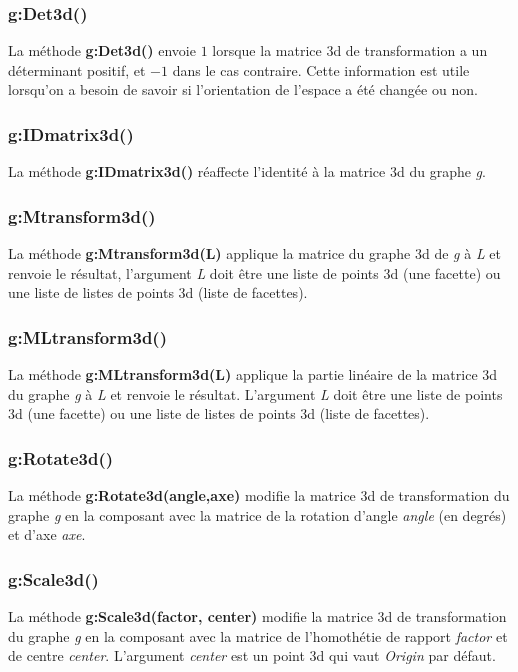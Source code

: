 \subsubsection{g:Det3d()}
La méthode \textbf{g:Det3d()} envoie $1$ lorsque la matrice 3d de transformation a un déterminant positif, et $-1$ dans le cas contraire. Cette information est utile lorsqu'on a besoin de savoir si l'orientation de l'espace a été changée ou non.

\subsubsection{g:IDmatrix3d()}
La méthode \textbf{g:IDmatrix3d()} réaffecte l'identité à la matrice 3d du graphe \emph g.

\subsubsection{g:Mtransform3d()}
La méthode \textbf{g:Mtransform3d(L)} applique la matrice du graphe 3d de \emph g à \emph{L} et renvoie le résultat, l'argument \emph L doit être une liste de points 3d (une facette) ou une liste de listes de points 3d (liste de facettes).

\subsubsection{g:MLtransform3d()}
La méthode \textbf{g:MLtransform3d(L)} applique la partie linéaire de la matrice 3d du graphe \emph g à \emph{L} et renvoie le résultat. L'argument \emph L doit être une liste de points 3d (une facette) ou une liste de listes de points 3d (liste de facettes).

\subsubsection{g:Rotate3d()}
La méthode \textbf{g:Rotate3d(angle,axe)} modifie la matrice 3d de transformation du graphe \emph g en la composant avec la matrice de la rotation d'angle \emph{angle} (en degrés) et d'axe \emph{axe}. 

\subsubsection{g:Scale3d()}
La méthode \textbf{g:Scale3d(factor, center)} modifie la matrice 3d de transformation du graphe \emph g en la composant avec la matrice de l'homothétie de rapport \emph{factor} et de centre \emph{center}. L'argument \emph{center} est un point 3d qui vaut \emph{Origin} par défaut.


